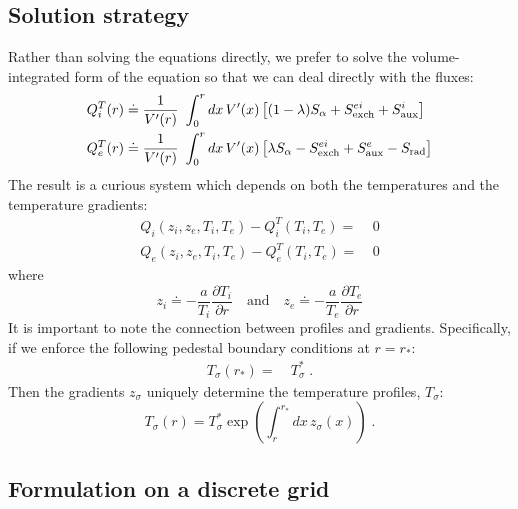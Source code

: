 \documentclass[12pt]{article}
\newcommand\vpr{V^\prime}
\begin{document}
\subsection{Solution strategy}

Rather than solving the equations directly, we prefer to solve 
the volume-integrated form of the equation so that we can 
deal directly with the fluxes:
%
\begin{align}
Q_i^T(r) \doteq \frac{1}{\vpr(r)} & ~\int_0^r dx \, \vpr(x) \left[
  (1-\lambda) S_\alpha + S_{\rm exch}^{ei} + S_{\rm aux}^i \right] \\ 
Q_e^T(r) \doteq \frac{1}{\vpr(r)} & ~\int_0^r dx \, \vpr(x) \left[ 
  \lambda S_\alpha - S_{\rm exch}^{ei} + S_{\rm aux}^e - S_{\rm rad} \right]  
\end{align}
%
The result is a curious system which depends on both the temperatures 
and the temperature gradients:
%
\begin{align}
Q_i(z_i,z_e,T_i,T_e) - Q_i^T(T_i,T_e) = &~0 \\
Q_e(z_i,z_e,T_i,T_e) - Q_e^T(T_i,T_e) = &~0
\end{align}
%
where
%
\begin{equation}
z_i \doteq - \frac{a}{T_i} \frac{\partial T_i}{\partial r} 
\quad\mbox{and}\quad 
z_e \doteq - \frac{a}{T_e} \frac{\partial T_e}{\partial r}
\end{equation}
%
It is important to note the connection between profiles and 
gradients.  Specifically, if we enforce the following pedestal 
boundary conditions at $r=r_*$:
%
\begin{align}
T_\sigma(r_*) = &~T_\sigma^* \; .
\end{align}
%
Then the gradients $z_\sigma$ uniquely determine the 
temperature profiles, $T_\sigma$:
%
\begin{equation}
T_\sigma(r) = T_\sigma^* 
 \exp\left( \int_r^{r_*} dx \, z_\sigma(x) \right) \; .
\end{equation}

\subsection{Formulation on a discrete grid}
\end{document}
